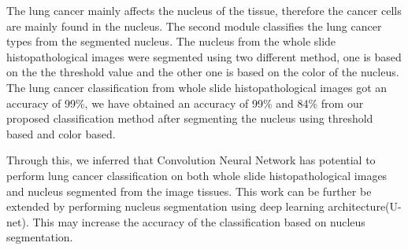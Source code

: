 \documentclass[conference]{IEEEtran}
\begin{document}
The lung cancer mainly affects the nucleus of the tissue, therefore the cancer cells are mainly found in the nucleus. The second module classifies the lung cancer types from the segmented nucleus. The nucleus from the whole slide histopathological images were segmented using two different method, one is based on the the threshold value and the other one is based on the color of the nucleus. The lung cancer classification from whole slide histopathological images got an accuracy of 99\%, we have obtained an accuracy of 99\% and 84\% from our proposed classification method after segmenting the nucleus using threshold based and color based. 

Through this, we inferred that Convolution Neural Network has potential to perform lung cancer classification on both whole slide histopathological images and nucleus segmented from the image tissues. This work can be further be extended by performing nucleus segmentation using deep learning architecture(U-net). This may increase the accuracy of the classification based on nucleus segmentation. 



   
   
\end{document}
